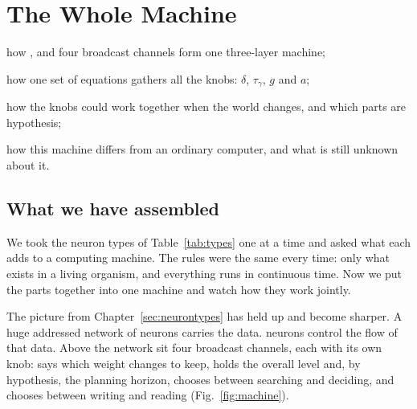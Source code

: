 \chapter{The Whole Machine}
\label{sec:synthesis}
\begin{chaptergoals}
\item how ,  and four broadcast channels form one three-layer machine;
\item how one set of equations gathers all the knobs: $\delta$, $\tau_\gamma$, $g$ and $a$;
\item how the knobs could work together when the world changes, and which parts are hypothesis;
\item how this machine differs from an ordinary computer, and what is still unknown about it.
\end{chaptergoals}

\section{What we have assembled}

We took the neuron types of Table~\ref{tab:types} one at a time and asked what each adds to a computing machine. The rules were the same every time: only what exists in a living organism, and everything runs in continuous time. Now we put the parts together into one machine and watch how they work jointly.

The picture from Chapter~\ref{sec:neurontypes} has held up and become sharper. A huge addressed network of  neurons carries the data.  neurons control the flow of that data. Above the network sit four broadcast channels, each with its own knob:  says which weight changes to keep,  holds the overall level and, by hypothesis, the planning horizon,  chooses between searching and deciding, and  chooses between writing and reading (Fig.~\ref{fig:machine}).

